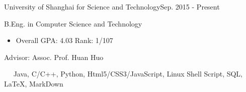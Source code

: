 \documentclass{sorahjy_cv}
\begin{document}
\pagestyle{empty}


\begin{cvHeader}
\end{cvHeader}

%
%

\begin{sectionContentSimple}{University of Shanghai for Science and Technology}{Sep. 2015 - Present}
	\item B.Eng. in Computer Science and Technology
	\begin{itemize}
		\item Overall GPA: 4.03 \quad Rank: 1/107
	\end{itemize}
	\item Advisor: Assoc. Prof. Huan Huo
\end{sectionContentSimple}

%
%






%
%

\begin{description}{}
	\item{\ \ }  Java, C/C++, Python, Html5/CSS3/JavaScript, Linux Shell Script, SQL, \LaTeX, MarkDown
\end{description}
\end{document}
